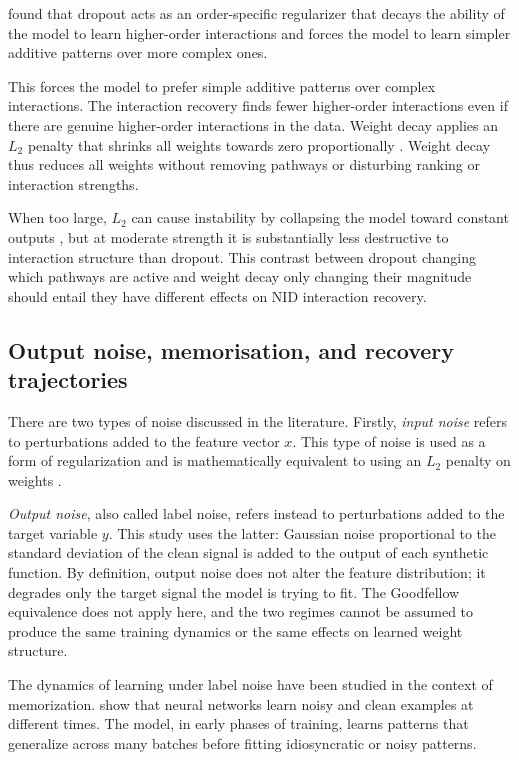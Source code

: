 \documentclass{article}
\begin{document}
\cite{lengerich2021dropoutregularizerinteractioneffects} found that dropout acts as an order-specific regularizer that decays the ability of the model to learn higher-order interactions and forces the model to learn simpler additive patterns over more complex ones.

This forces the model to prefer simple additive patterns over complex interactions. The interaction recovery finds fewer higher-order interactions even if there are genuine higher-order interactions in the data. Weight decay applies an \(L_2\) penalty that shrinks all weights towards zero proportionally \citep{Goodfellow-et-al-2016}. Weight decay thus reduces all weights without removing pathways or disturbing ranking or interaction strengths.

When too large, \(L_2\) can cause instability by collapsing the model toward constant outputs \citep{lengerich2021dropoutregularizerinteractioneffects}, but at moderate strength it is substantially less destructive to interaction structure than dropout. This contrast between dropout changing which pathways are active and weight decay only changing their magnitude should entail they have different effects on NID interaction recovery.

\subsection{Output noise, memorisation, and recovery trajectories}

There are two types of noise discussed in the literature. Firstly, \textit{input noise} refers to perturbations added to the feature vector \(x\). This type of noise is used as a form of regularization and is mathematically equivalent to using an \(L_2\) penalty on weights \citep{Goodfellow-et-al-2016}.

\textit{Output noise}, also called label noise, refers instead to perturbations added to the target variable \(y\). This study uses the latter: Gaussian noise proportional to the standard deviation of the clean signal is added to the output of each synthetic function. By definition, output noise does not alter the feature distribution; it degrades only the target signal the model is trying to fit. The Goodfellow equivalence does not apply here, and the two regimes cannot be assumed to produce the same training dynamics or the same effects on learned weight structure.

The dynamics of learning under label noise have been studied in the context of memorization. \cite{arpit2017closerlookmemorizationdeep} show that neural networks learn noisy and clean examples at different times. The model, in early phases of training, learns patterns that generalize across many batches before fitting idiosyncratic or noisy patterns.
\end{document}
